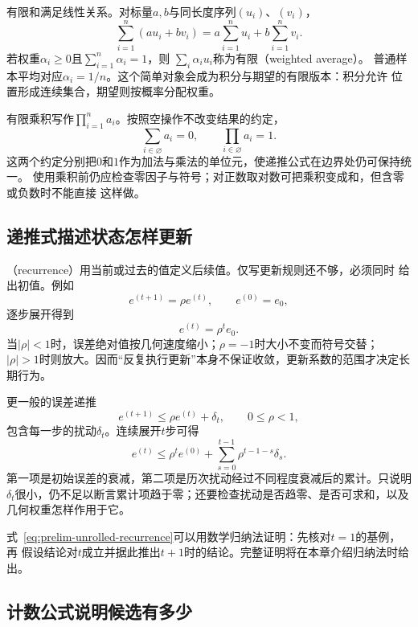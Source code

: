 有限和满足线性关系。对标量$a,b$与同长度序列$(u_i)$、$(v_i)$，
\[
  \sum_{i=1}^{n}(au_i+bv_i)
  =
  a\sum_{i=1}^{n}u_i+b\sum_{i=1}^{n}v_i.
\]
若权重$\alpha_i\geq0$且$\sum_{i=1}^{n}\alpha_i=1$，则
$\sum_i\alpha_i u_i$称为有限（weighted average）。
普通样本平均对应$\alpha_i=1/n$。这个简单对象会成为积分与期望的有限版本：积分允许
位置形成连续集合，期望则按概率分配权重。

有限乘积写作$\prod_{i=1}^{n}a_i$。按照空操作不改变结果的约定，
\[
  \sum_{i\in\varnothing}a_i=0,\qquad
  \prod_{i\in\varnothing}a_i=1.
\]
这两个约定分别把$0$和$1$作为加法与乘法的单位元，使递推公式在边界处仍可保持统一。
使用乘积前仍应检查零因子与符号；对正数取对数可把乘积变成和，但含零或负数时不能直接
这样做。

\subsection{递推式描述状态怎样更新}

（recurrence）用当前或过去的值定义后续值。仅写更新规则还不够，必须同时
给出初值。例如
\begin{equation}
  e^{(t+1)}=\rho e^{(t)},\qquad e^{(0)}=e_0,
  \label{eq:prelim-geometric-recurrence}
\end{equation}
逐步展开得到
\[
  e^{(t)}=\rho^t e_0.
\]
当$|\rho|<1$时，误差绝对值按几何速度缩小；$\rho=-1$时大小不变而符号交替；
$|\rho|>1$时则放大。因而“反复执行更新”本身不保证收敛，更新系数的范围才决定长期行为。

更一般的误差递推
\begin{equation}
  e^{(t+1)}\leq \rho e^{(t)}+\delta_t,
  \qquad 0\leq\rho<1,
  \label{eq:prelim-perturbed-recurrence}
\end{equation}
包含每一步的扰动$\delta_t$。连续展开$t$步可得
\begin{equation}
  e^{(t)}
  \leq
  \rho^t e^{(0)}
  +
  \sum_{s=0}^{t-1}\rho^{t-1-s}\delta_s.
  \label{eq:prelim-unrolled-recurrence}
\end{equation}
第一项是初始误差的衰减，第二项是历次扰动经过不同程度衰减后的累计。只说明
$\delta_t$很小，仍不足以断言累计项趋于零；还要检查扰动是否趋零、是否可求和，以及
几何权重怎样作用于它。

式~\eqref{eq:prelim-unrolled-recurrence}可以用数学归纳法证明：先核对$t=1$的基例，再
假设结论对$t$成立并据此推出$t+1$时的结论。完整证明将在本章介绍归纳法时给出。

\subsection{计数公式说明候选有多少}

